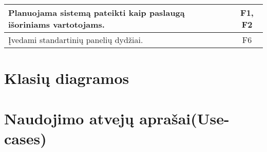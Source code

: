 \documentclass[a4paper,12pt]{article}
\begin{document}
\begin{frame}
\begin{tabular}{|l|c|}
Planuojama sistemą pateikti kaip paslaugą išoriniams vartotojams.                                                                                                                                                                                                                                                                                         &       F1, F2               \\ \hline
Įvedami standartinių panelių dydžiai.                                                                                                                                                                                                                                                                                                                     &          F6             \\ \hline
\end{tabular}
\end{frame}


\section{Klasių diagramos}

\section{Naudojimo atvejų aprašai(Use-cases)}



\end{document}
